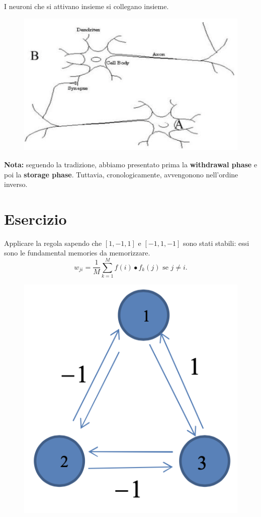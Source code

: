 I neuroni che si attivano insieme si collegano insieme.
\begin{figure}[!h]
    \includegraphics[scale=.5]{images/hopfield_networks/neurons.png}
    \centering
\end{figure}



\textbf{Nota:} seguendo la tradizione, abbiamo presentato prima la \textbf{withdrawal phase} e poi la \textbf{storage phase}. Tuttavia, cronologicamente, avvengonono nell'ordine inverso.

\section{Esercizio}
Applicare la regola sapendo che $[1,-1,1]$ e $[-1,1,-1]$ sono stati stabili: essi sono le fundamental memories da memorizzare.
\begin{equation}
    w_{ji}=\frac{1}{M}\sum^M_{k=1}f(i)\bullet f_k(j) \text{ se } j\neq i.
\end{equation}
\begin{figure}[!h]
    \includegraphics[scale=.5]{images/hopfield_networks/ex03.png}
    \centering
\end{figure}



